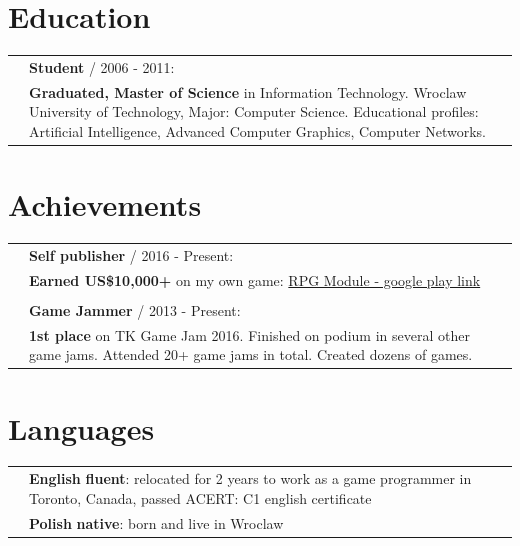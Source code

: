 \documentclass[12pt,a4paper]{article}
\begin{document}
\begin{multicols}{2}
\begin{tabular}{ >{\RaggedLeft}p{0cm}   p{8.5cm}  }
	\end{tabular}

\vfill

\section*{Education }
	\begin{tabular}{ >{\RaggedLeft}p{0cm}  p{8.5cm}   }

		 & \textbf{Student} / 2006 - 2011: \\
		& \hspace{5mm}  \textbf{Graduated, Master of Science} in Information Technology. Wroclaw University of Technology, Major: Computer Science. Educational profiles: Artificial Intelligence, Advanced Computer Graphics, Computer Networks.   \\	 
	\end{tabular}


\section*{Achievements}
	\begin{tabular}  { >{\RaggedLeft}p{0cm}   p{8.5cm} }  
		& \textbf{Self publisher} / 2016 - Present: \\
		& \hspace{5mm} \textbf{Earned US\$10,000+} on my own game: {\href{https://play.google.com/store/apps/details?id=com.wyspianStudios.rpgModuleFull}{RPG Module - google play link}}   \\
		 & \\
		 & \textbf{Game Jammer} / 2013 - Present: \\
		& \hspace{5mm} \textbf{1st place} on TK Game Jam 2016. Finished on podium in several other game jams. Attended 20+ game jams in total. Created dozens of  games.  \\
	\end{tabular} 

\section*{Languages }
\begin{tabular}{ >{\RaggedLeft}p{0cm}  p{8.5cm}   }
	& \textbf{English}   \textbf{fluent}: relocated for 2 years to work as a game programmer in Toronto, Canada, passed ACERT: C1 english certificate  \\
	&  \textbf{Polish} \textbf{native}: born and live in Wroclaw \\	 
\end{tabular}

\vfill

\end{multicols}
\end{document}
